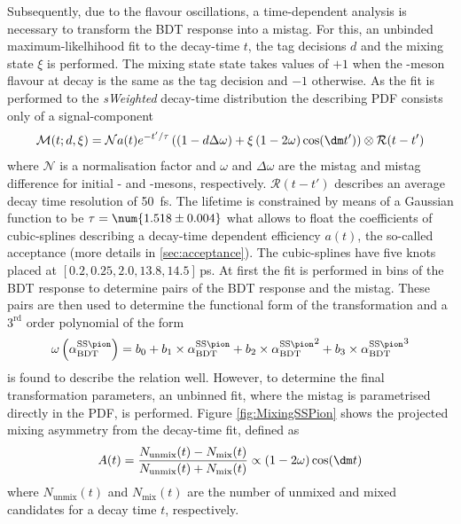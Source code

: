 Subsequently, due to the flavour oscillations, a time-dependent analysis is necessary to transform the BDT response into a mistag.
For this, an unbinded maximum-likelhihood fit to the decay-time $t$, the tag decisions $d$ and the mixing state $\xi$ is performed.
The mixing state state takes values of $+1$ when the \B-meson flavour at decay is the same as the tag decision and $-1$ otherwise.
As the fit is performed to the \emph{sWeighted} decay-time distribution the describing PDF consists only of a signal-component
\begin{equation}
\mathcal{M}(t;d,\xi)=\mathcal{N}a(t)e^{-t'/\tau}\left(\left(1-d\Delta\omega\right)+\xi\left(1-2\omega\right)\cos\!\left(\dm t'\right)\right)\otimes\mathcal{R}(t-t')
\end{equation}
where $\mathcal{N}$ is a normalisation factor and $\omega$ and $\Delta\omega$ are the mistag and mistag difference for initial \Bz- and \Bzb-mesons, respectively.
$\mathcal{R}(t-t')$ describes an average decay time resolution of \SI{50}{\femto\second}.
The lifetime is constrained by means of a Gaussian function to be $\tau=\num{1.518\pm0.004}$ what allows to float the coefficients of cubic-splines describing a decay-time dependent efficiency $a(t)$, the so-called acceptance (more details in \cref{sec:acceptance}).
The cubic-splines have five knots placed at $[0.2, 0.25, 2.0, 13.8, 14.5]\,$\si{\pico\second}.
At first the fit is performed in bins of the BDT response to determine pairs of the BDT response and the mistag.
These pairs are then used to determine the functional form of the transformation and a $3^{\text{rd}}$ order polynomial of the form
\begin{equation}
\omega\left(\alpha^{\text{SS}\pion}_\text{BDT}\right)=b_0+b_1\times\alpha^{\text{SS}\pion}_\text{BDT}+b_2\times{\alpha^{\text{SS}\pion}_\text{BDT}}^2+b_3\times{\alpha^{\text{SS}\pion}_\text{BDT}}^3
\end{equation}
is found to describe the relation well.
However, to determine the final transformation parameters, an unbinned fit, where the mistag is parametrised directly in the PDF, is performed.
Figure \eqref{fig:MixingSSPion} shows the projected mixing asymmetry from the decay-time fit, defined as
\begin{equation}
A(t)=\frac{N_{\text{unmix}}(t)-N_{\text{mix}}(t)}{N_{\text{unmix}}(t)+N_{\text{mix}}(t)}\propto\left(1-2\omega\right)\cos\!\left(\dm t\right)
\end{equation}
where $N_{\text{unmix}}(t)$ and $N_{\text{mix}}(t)$ are the number of unmixed  and mixed \Bz candidates for a decay time $t$, respectively.
